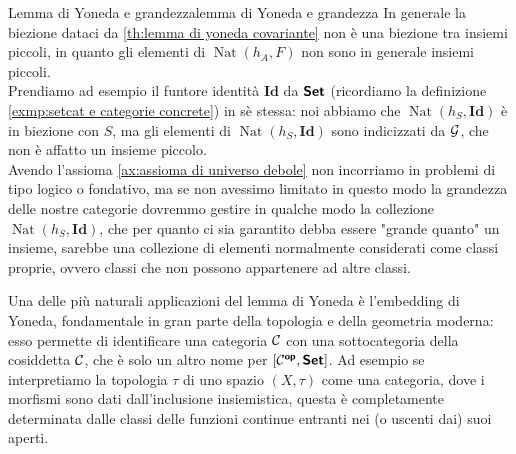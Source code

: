 \documentclass{article}
\renewcommand\C{\mc{C}}
\newcommand\nat{\operatorname{Nat}}
\begin{document}
\begin{remark}{Lemma di Yoneda e grandezza}{lemma di Yoneda e grandezza}
    In generale la biezione dataci da \ref{th:lemma di yoneda covariante} non è una biezione tra insiemi piccoli, in quanto gli elementi di $\nat(h_A,F)$ non sono in generale insiemi piccoli.\\
    Prendiamo ad esempio il funtore identità $\mathbf{Id}$ da $\text{\sffamily\textbf{Set}}$ (ricordiamo la definizione \ref{exmp:setcat e categorie concrete}) in sè stessa: noi abbiamo che $\nat(h_S,\mathbf{Id})$ è in biezione con $S$, ma gli elementi di $\nat(h_S,\mathbf{Id})$ sono indicizzati da $\mathcal{G}$, che non è affatto un insieme piccolo.\\
    Avendo l'assioma \ref{ax:assioma di universo debole} non incorriamo in problemi di tipo logico o fondativo, ma se non avessimo limitato in questo modo la grandezza delle nostre categorie dovremmo gestire in qualche modo la collezione $\nat(h_S,\mathbf{Id})$, che per quanto ci sia garantito debba essere "grande quanto" un insieme, sarebbe una collezione di elementi normalmente considerati come classi proprie, ovvero classi che non possono appartenere ad altre classi.
\end{remark}

Una delle più naturali applicazioni del lemma di Yoneda è l'embedding di Yoneda, fondamentale in gran parte della topologia e della geometria moderna: esso permette di identificare una categoria $\C$ con una sottocategoria della cosiddetta  $\C$, che è solo un altro nome per $[\C^\op,\setcat]$. Ad esempio se interpretiamo la topologia $\tau$ di uno spazio $(X,\tau)$ come una categoria, dove i morfismi sono dati dall'inclusione insiemistica, questa è completamente determinata dalle classi delle funzioni continue entranti nei (o uscenti dai) suoi aperti.
\end{document}
